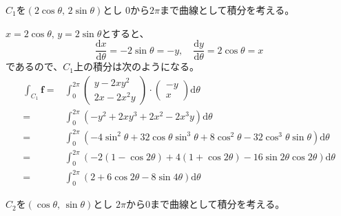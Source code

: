 \documentclass[12pt,b5paper]{ltjsarticle}
\begin{document}
\begin{enumerate}
\begin{enumerate}
            $C_1$を$(2\cos\theta,\,2\sin\theta)$とし
            $0$から$2\pi$まで曲線として積分を考える。

            $x=2\cos\theta,\,y=2\sin\theta$とすると、
            \begin{equation}
             \frac{\mathrm{d} x}{\mathrm{d} \theta} = -2\sin\theta = -y,\quad
              \frac{\mathrm{d} y}{\mathrm{d} \theta} = 2\cos\theta = x
            \end{equation}
            であるので、$C_1$上の積分は次のようになる。
            \begin{align}
             \int_{C_1}\bm{f}
             = & \int_{0}^{2\pi}
             \begin{pmatrix}y-2xy^2\\2x-2x^2y\end{pmatrix}
                  \cdot\begin{pmatrix}-y\\x\end{pmatrix}\mathrm{d}\theta\\
             = & \int_{0}^{2\pi}(-y^2+2xy^3+2x^2-2x^3y)\mathrm{d}\theta\\
             = & \int_{0}^{2\pi}(-4\sin^2\theta+32\cos\theta\sin^3\theta+8\cos^2\theta-32\cos^3\theta\sin\theta)\mathrm{d}\theta\\
             = & \int_{0}^{2\pi}(-2(1-\cos2\theta)+4(1+\cos2\theta)-16\sin2\theta\cos2\theta)\mathrm{d}\theta\\
             = & \int_{0}^{2\pi}(2+6\cos2\theta-8\sin4\theta)\mathrm{d}\theta
            \end{align}

            $C_2$を$(\cos\theta,\,\sin\theta)$とし
            $2\pi$から$0$まで曲線として積分を考える。


\end{enumerate}
\end{enumerate}
\end{document}
